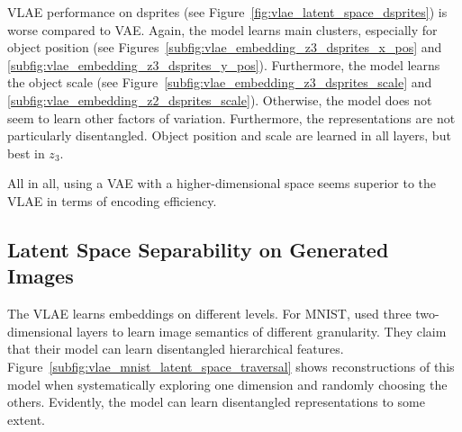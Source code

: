 \ac{VLAE} performance on dsprites (see Figure~\ref{fig:vlae_latent_space_dsprites}) is worse compared to \ac{VAE}.
Again, the model learns main clusters, especially for object position (see Figures~\ref{subfig:vlae_embedding_z3_dsprites_x_pos} and \ref{subfig:vlae_embedding_z3_dsprites_y_pos}).
Furthermore, the model learns the object scale (see Figure~\ref{subfig:vlae_embedding_z3_dsprites_scale} and \ref{subfig:vlae_embedding_z2_dsprites_scale}).
Otherwise, the model does not seem to learn other factors of variation.
Furthermore, the representations are not particularly disentangled.
Object position and scale are learned in all layers, but best in $z_3$.

All in all, using a \ac{VAE} with a higher-dimensional space seems superior to the \ac{VLAE} in terms of encoding efficiency.

\subsection{Latent Space Separability on Generated Images}\label{subsec:independence-of-vlae-embeddings}

The VLAE learns embeddings on different levels.
For MNIST, \citet{zhao2017learning} used three two-dimensional layers to learn image semantics of different granularity.
They claim that their model can learn disentangled hierarchical features.
Figure~\ref{subfig:vlae_mnist_latent_space_traversal} shows reconstructions of this model when systematically exploring one dimension and randomly choosing the others.
Evidently, the model can learn disentangled representations to some extent.

